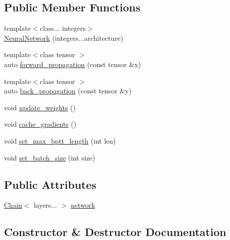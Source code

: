 \subsection*{Public Member Functions}
\begin{DoxyCompactItemize}
\item 
{\footnotesize template$<$class... integers$>$ }\\\hyperlink{structBC_1_1nn_1_1NeuralNetwork_a97ba9c2a9737ac67855e192a168ad5f6}{Neural\+Network} (integers...\+architecture)
\item 
{\footnotesize template$<$class tensor $>$ }\\auto \hyperlink{structBC_1_1nn_1_1NeuralNetwork_a7573d37f2c8a4a0c48ae6920f66ac1b4}{forward\+\_\+propagation} (const tensor \&x)
\item 
{\footnotesize template$<$class tensor $>$ }\\auto \hyperlink{structBC_1_1nn_1_1NeuralNetwork_a7180408db6873baef8bca581d0fe8156}{back\+\_\+propagation} (const tensor \&y)
\item 
void \hyperlink{structBC_1_1nn_1_1NeuralNetwork_aa2145618d2030424f8dbc131e07fe9e0}{update\+\_\+weights} ()
\item 
void \hyperlink{structBC_1_1nn_1_1NeuralNetwork_aed431d01fabaffef03a64c4241ee0cba}{cache\+\_\+gradients} ()
\item 
void \hyperlink{structBC_1_1nn_1_1NeuralNetwork_af0aab8ec4df284b212c794c3c039dd8b}{set\+\_\+max\+\_\+bptt\+\_\+length} (int len)
\item 
void \hyperlink{structBC_1_1nn_1_1NeuralNetwork_acec597b3eb7cb764c740d802a57fb0e4}{set\+\_\+batch\+\_\+size} (int size)
\end{DoxyCompactItemize}
\subsection*{Public Attributes}
\begin{DoxyCompactItemize}
\item 
\hyperlink{structBC_1_1nn_1_1Chain}{Chain}$<$ layers... $>$ \hyperlink{structBC_1_1nn_1_1NeuralNetwork_aadc03d1f2460bf77b6f8181a3b5153c1}{network}
\end{DoxyCompactItemize}


\subsection{Constructor \& Destructor Documentation}
